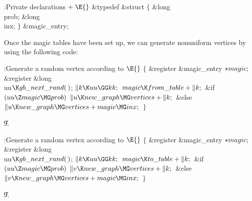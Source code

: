 \B{}:Private declarations\X${}\mathrel+\E{}$\6
\&{typedef} \&{struct} ${}\{{}$\1\6
\&{long} \\{prob};\6
\&{long} \\{inx};\2\6
${}\}{}$ \&{magic\_entry};\par
\fi

Once the magic tables have been set up, we can generate
nonuniform vertices by using the following code:

\Y\B\4:Generate a random vertex  according to %
\X${}\E{}$\6
${}\{{}$\5
\1\&{register} \&{magic\_entry} ${}{*}\\{magic};{}$\6
\&{register} \&{long} \\{uu}${}\K\\{gb\_next\_rand}(\,){}$;\7
${}\|k\K\\{uu}\GG\\{kk};{}$\6
${}\\{magic}\K\\{from\_table}+\|k;{}$\6
\&{if} ${}(\\{uu}\Z\\{magic}\MG\\{prob}){}$\1\5
${}\|u\K\\{new\_graph}\MG\\{vertices}+\|k;{}$\2\6
\&{else}\1\5
${}\|u\K\\{new\_graph}\MG\\{vertices}+\\{magic}\MG\\{inx};{}$\2\6
\4${}\}{}$\2\par
\U9.\fi

\B{}:Generate a random vertex  according to %
\X${}\E{}$\6
${}\{{}$\5
\1\&{register} \&{magic\_entry} ${}{*}\\{magic};{}$\6
\&{register} \&{long} \\{uu}${}\K\\{gb\_next\_rand}(\,){}$;\7
${}\|k\K\\{uu}\GG\\{kk};{}$\6
${}\\{magic}\K\\{to\_table}+\|k;{}$\6
\&{if} ${}(\\{uu}\Z\\{magic}\MG\\{prob}){}$\1\5
${}\|v\K\\{new\_graph}\MG\\{vertices}+\|k;{}$\2\6
\&{else}\1\5
${}\|v\K\\{new\_graph}\MG\\{vertices}+\\{magic}\MG\\{inx};{}$\2\6
\4${}\}{}$\2\par
\U9.\fi

